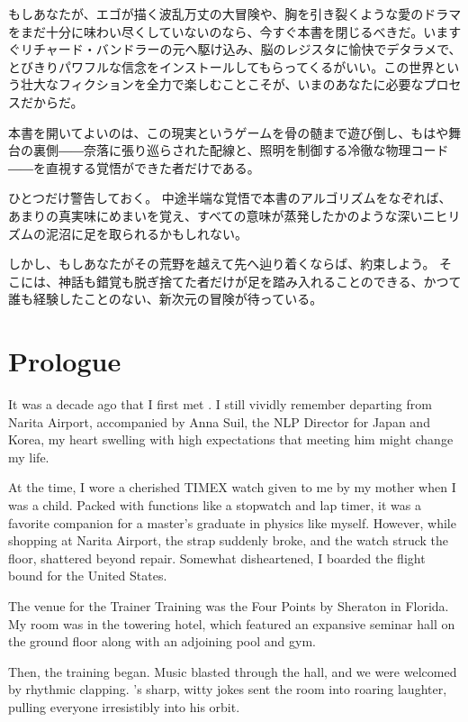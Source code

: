     もしあなたが、エゴが描く波乱万丈の大冒険や、胸を引き裂くような愛のドラマをまだ十分に味わい尽くしていないのなら、今すぐ本書を閉じるべきだ。いますぐリチャード・バンドラーの元へ駆け込み、脳のレジスタに愉快でデタラメで、とびきりパワフルな信念をインストールしてもらってくるがいい。この世界という壮大なフィクションを全力で楽しむことこそが、いまのあなたに必要なプロセスだからだ。

    本書を開いてよいのは、この現実というゲームを骨の髄まで遊び倒し、もはや舞台の裏側――奈落に張り巡らされた配線と、照明を制御する冷徹な物理コード――を直視する覚悟ができた者だけである。

    ひとつだけ警告しておく。
    中途半端な覚悟で本書のアルゴリズムをなぞれば、あまりの真実味にめまいを覚え、すべての意味が蒸発したかのような深いニヒリズムの泥沼に足を取られるかもしれない。

    しかし、もしあなたがその荒野を越えて先へ辿り着くならば、約束しよう。
    そこには、神話も錯覚も脱ぎ捨てた者だけが足を踏み入れることのできる、かつて誰も経験したことのない、新次元の冒険が待っている。
\else
    \chapter*{Prologue}
    
    It was a decade ago that I first met \fullDrBandler.
    I still vividly remember departing from Narita Airport, accompanied by Anna Suil, the NLP Director for Japan and Korea, my heart swelling with high expectations that meeting him might change my life.

    At the time, I wore a cherished TIMEX watch given to me by my mother when I was a child. Packed with functions like a stopwatch and lap timer, it was a favorite companion for a master's graduate in physics like myself.
    However, while shopping at Narita Airport, the strap suddenly broke, and the watch struck the floor, shattered beyond repair. Somewhat disheartened, I boarded the flight bound for the United States.

    The venue for the Trainer Training was the Four Points by Sheraton in Florida. My room was in the towering hotel, which featured an expansive seminar hall on the ground floor along with an adjoining pool and gym.

    Then, the training began.
    Music blasted through the hall, and we were welcomed by rhythmic clapping. \txtBandler's sharp, witty jokes sent the room into roaring laughter, pulling everyone irresistibly into his orbit.

